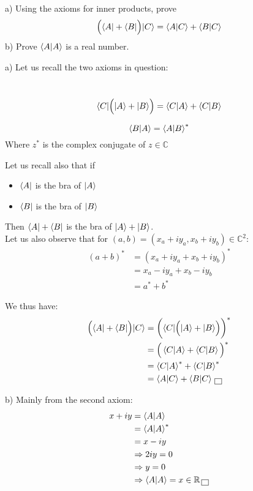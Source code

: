 \documentclass[solutions.tex]{subfiles}
\begin{document}
\maketitle
\begin{exercise}
a) Using the axioms for inner products, prove
$$ \Big( \langle A| + \langle B|\Big) |C\rangle = \left\langle A \middle| C \right\rangle + \left\langle B \middle| C \right\rangle $$
b) Prove $\left\langle A \middle| A \right\rangle$ is a real number.
\end{exercise}
\hrr

a) Let us recall the two axioms in question:
\begin{axiom}\ \\
$$ \langle C| \Big( |A\rangle + |B\rangle \Big) = \left\langle C \middle| A \right\rangle + \left\langle C \middle| B \right\rangle $$
\end{axiom}
\begin{axiom}
$$ \left\langle B \middle| A \right\rangle = \left\langle A \middle| B \right\rangle^{*} $$
Where $z^{*}$ is the complex conjugate of $z\in\mathbb{C}$
\end{axiom}

Let us recall also that if
\begin{itemize}
	\item $\langle A|$ is the bra of $|A\rangle$
	\item $\langle B|$ is the bra of $|B\rangle$
\end{itemize}
Then $\langle A|+\langle B|$ is the bra of $|A\rangle+|B\rangle$. \\

Let us also observe that for
$(a, b) = (x_a+iy_a, x_b+iy_b) \in\mathbb{C}^2$:
\begin{align*}
	(a+b)^* &= (x_a+iy_a+x_b+iy_b)^* \\
	~ &= x_a-iy_a+x_b-iy_b \\
	~ &= a^* + b^*
\end{align*}

We thus have:
\begin{align*}
	\Big( \langle A| + \langle B| \Big) |C\rangle
		&= \biggl(\langle C|\Big( |A\rangle + |B\rangle\Big)\biggr)^* \\
	~ &= \Big(\left\langle C \middle| A \right\rangle + \left\langle C \middle| B \right\rangle\Big)^* \\
	~ &= \left\langle C \middle| A \right\rangle^* + \left\langle C \middle| B \right\rangle^* \\
	~ &= \left\langle A \middle| C \right\rangle + \left\langle B \middle| C \right\rangle \,\boxed{\,}
\end{align*}

b) Mainly from the second axiom:
\begin{align*}
	x+iy &= \left\langle A \middle| A \right\rangle \\
	~ &= \left\langle A \middle| A \right\rangle^* \\
	~ &= x-iy \\
	~ &\Rightarrow 2iy = 0 \\
	~ &\Rightarrow y = 0 \\
	~ &\Rightarrow \left\langle A \middle| A \right\rangle=x\in\mathbb{R}\,\boxed{\,}
\end{align*}
\end{document}
